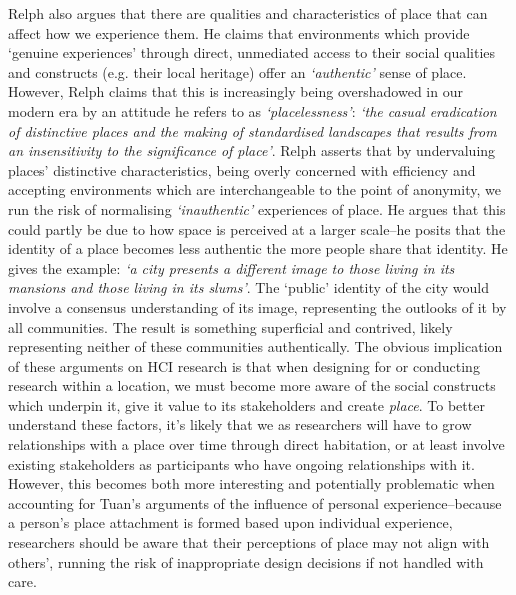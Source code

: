 Relph also argues that there are qualities and characteristics of place that can affect how we experience them. He claims that environments which provide `genuine experiences' through direct, unmediated access to their social qualities and constructs (e.g. their local heritage) offer an \textit{`authentic'} sense of place. However, Relph claims that this is increasingly being overshadowed in our modern era by an attitude he refers to as \textit{`placelessness'}: \textit{`the casual eradication of distinctive places and the making of standardised landscapes that results from an insensitivity to the significance of place'}. Relph asserts that by undervaluing places' distinctive characteristics, being overly concerned with efficiency and accepting environments which are interchangeable to the point of anonymity, we run the risk of normalising \textit{`inauthentic'} experiences of place. He argues that this could partly be due to how space is perceived at a larger scale--he posits that the identity of a place becomes less authentic the more people share that identity. He gives the example: \textit{`a city presents a different image to those living in its mansions and those living in its slums'}. The `public' identity of the city would involve a consensus understanding of its image, representing the outlooks of it by all communities. The result is something superficial and contrived, likely representing neither of these communities authentically.  The obvious implication of these arguments on HCI research is that when designing for or conducting research within a location, we must become more aware of the social constructs which underpin it, give it value to its stakeholders and create \textit{place}. To better understand these factors, it's likely that we as researchers will have to grow relationships with a place over time through direct habitation, or at least involve existing stakeholders as participants who have ongoing relationships with it. However, this becomes both more interesting and potentially problematic when accounting for Tuan's arguments of the influence of personal experience--because a person's place attachment is formed based upon individual experience, researchers should be aware that their perceptions of place may not align with others', running the risk of inappropriate design decisions if not handled with care. 

